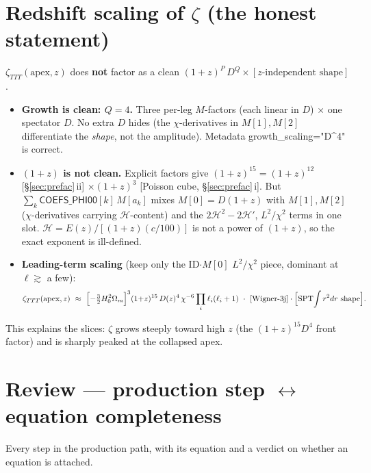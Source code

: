 \documentclass[11pt]{article}
\newcommand{\chh}{\chi}
\newcommand{\Dgrow}{D}
\newcommand{\Hcal}{\mathcal{H}}
\begin{document}
\section{Redshift scaling of $\zeta$ (the honest statement)}
\label{sec:zscaling}
$\zeta_{TTT}(\mathrm{apex},z)$ does \textbf{not} factor as a clean
$(1{+}z)^P\,\Dgrow^Q\times[\text{$z$-independent shape}]$.
\begin{itemize}
\item \textbf{Growth is clean: $Q=4$.} Three per-leg $M$-factors (each linear in $\Dgrow$)
  $\times$ one spectator $\Dgrow$. No extra $\Dgrow$ hides (the $\chh$-derivatives in
  $M[1],M[2]$ differentiate the \emph{shape}, not the amplitude). Metadata
  \textsf{growth\_scaling="D\textasciicircum 4"} is correct.
\item \textbf{$(1{+}z)$ is not clean.} Explicit factors give $(1{+}z)^{15}=(1{+}z)^{12}$
  [\S\ref{sec:prefac}\,ii] $\times(1{+}z)^3$ [Poisson cube, \S\ref{sec:prefac}\,i]. But
  $\sum_k\textsf{COEFS\_PHI00}[k]\,M[a_k]$ mixes $M[0]=\Dgrow(1{+}z)$ with $M[1],M[2]$
  ($\chh$-derivatives carrying $\Hcal$-content) and the $2\Hcal^2-2\Hcal'$, $L^2/\chh^2$
  terms in one slot. $\Hcal=E(z)/[(1{+}z)(c/100)]$ is not a power of $(1{+}z)$, so the exact
  exponent is ill-defined.
\item \textbf{Leading-term scaling} (keep only the ID$\cdot M[0]$ $L^2/\chh^2$ piece,
  dominant at $\ell\gtrsim$ a few):
\begin{equation}
\zeta_{TTT}(\mathrm{apex},z)\ \approx\
\Bigl[-\tfrac32 H_0^2\Omega_m\Bigr]^3 (1{+}z)^{15}\,\Dgrow(z)^4\,\chh^{-6}
\prod_i \ell_i(\ell_i+1)\ \cdot\ [\text{Wigner-3j}]\cdot\Bigl[\text{SPT}\!\int r^2dr\ \text{shape}\Bigr].
\end{equation}
\end{itemize}
This explains the slices: $\zeta$ grows steeply toward high $z$ (the $(1{+}z)^{15}\Dgrow^4$
front factor) and is sharply peaked at the collapsed apex.

\section{Review --- production step $\leftrightarrow$ equation completeness}
Every step in the production path, with its equation and a verdict on whether an equation is
attached.
\end{document}
